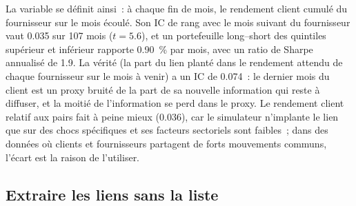 \begin{omfigure}

\label{fig:rs:cross-sectional-and-cross-asset-features:event}
\end{omfigure}

La variable se définit ainsi~: à chaque fin de mois, le rendement client cumulé du fournisseur sur le mois écoulé. Son IC de rang avec le mois
suivant du fournisseur vaut 0.035 sur 107 mois ($t = 5.6$), et un portefeuille long--short des quintiles supérieur et inférieur rapporte 0.90~\% par mois, avec un
ratio de Sharpe annualisé de 1.9. La vérité (la part du lien planté dans le rendement attendu de chaque fournisseur sur le mois à venir) a un
IC de 0.074~: le dernier mois du client est un proxy bruité de la part de sa nouvelle information qui reste à diffuser, et la moitié de l'information
se perd dans le proxy. Le rendement client relatif aux pairs fait à peine mieux (0.036), car le simulateur n'implante le lien que sur des chocs spécifiques
et ses facteurs sectoriels sont faibles~; dans des données où clients et fournisseurs partagent de forts mouvements communs, l'écart est
la raison de l'utiliser.

\subsection{Extraire les liens sans la liste}

